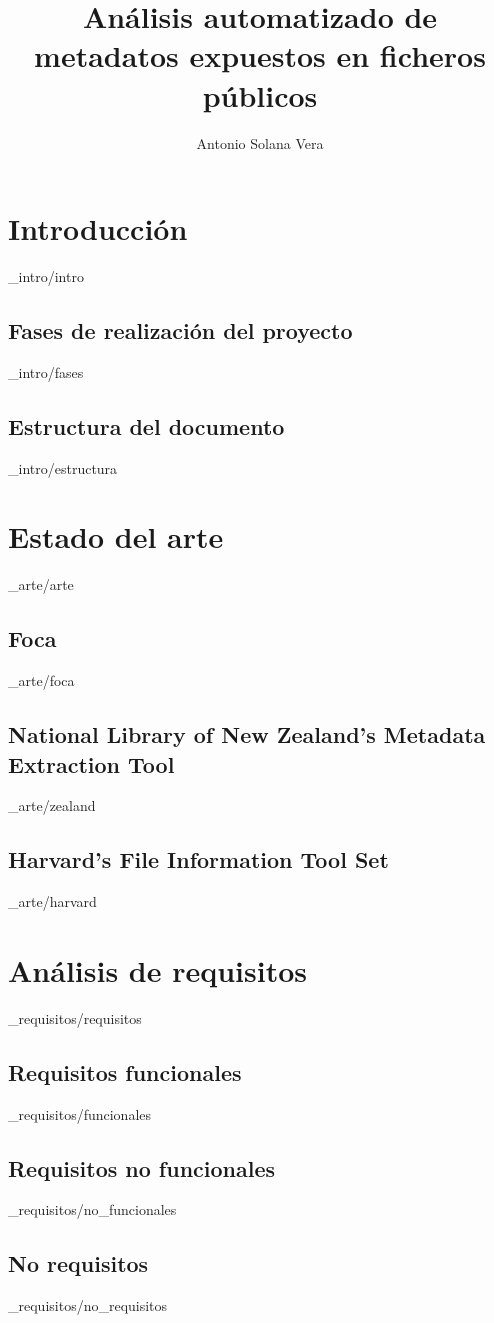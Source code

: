 \documentclass[epsbased,copyright,final,printable,covers,extendedindex,firstnumbered,tfg,gnuplot]{tfgtfmthesisuam}
\title{Análisis automatizado de metadatos expuestos en ficheros públicos}
\author{Antonio Solana Vera}
\begin{document}
\chapter{Introducción\label{CAP:INTRODUCCION}}{_intro/intro}
  \section{Fases de realización del proyecto\label{SEC:FASES}}{_intro/fases}
  \section{Estructura del documento\label{SEC:ESTRUCTURA}}{_intro/estructura}

\chapter{Estado del arte\label{CAP:ARTE}}{_arte/arte}
  \section{Foca\label{SEC:FOCA}}{_arte/foca}
  \section{National Library of New Zealand's Metadata Extraction Tool\label{SEC:NZMET}}{_arte/zealand}
  \section{Harvard's File Information Tool Set\label{SEC:FITS}}{_arte/harvard}

\chapter{Análisis de requisitos\label{CAP:REQUISITOS}}{_requisitos/requisitos}
  \section{Requisitos funcionales\label{SEC:NOFUNREQUISITOS}}{_requisitos/funcionales}
  \section{Requisitos no funcionales\label{SEC:FUNREQUISITOS}}{_requisitos/no_funcionales}
  \section{No requisitos\label{SEC:FUNREQUISITOS}}{_requisitos/no_requisitos}
\end{document}
